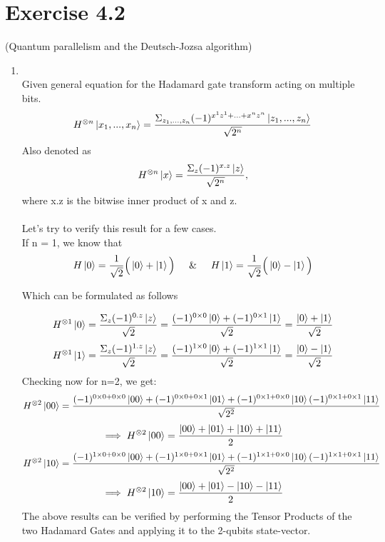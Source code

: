 \documentclass[a4paper,12pt]{article}
\begin{document}
\section*{Exercise 4.2}

 (Quantum parallelism and the Deutsch-Jozsa algorithm)

\begin{enumerate}[label=(\alph*)]
    \item \phantom{-} \\
        Given general equation for the Hadamard gate transform acting on multiple bits.
        \[H^{\otimes n}\ket{x_{1},...,x_{n}} = \frac{\Sigma_{z_{1},...,z_{n}}(-1)^{x^{1}z^{1}+...+x^{n}z^{n}}\ket{z_{1},...,z_{n}}}{\sqrt{2^{n}}}\]
        Also denoted as \[H^{\otimes n}\ket{x} = \frac{\Sigma_{z}(-1)^{x.z}\ket{z}}{\sqrt{2^{n}}},\]
        where x.z is the bitwise inner product of x and z. \\~\\
        Let's try to verify this result for a few cases.\\
        If n = 1, we know that \\
        \[H\ket{0} = \frac{1}{\sqrt{2}}\Big(\ket{0} + \ket{1}\Big) \hspace{5mm}\&\hspace{5mm}H\ket{1} = \frac{1}{\sqrt{2}}\Big(\ket{0} - \ket{1}\Big)\]
        \begin{center}
            Which can be formulated as follows
        \end{center}
        \[H^{\otimes 1}\ket{0} = \frac{\Sigma_{z}(-1)^{0.z}\ket{z}}{\sqrt{2}} = \frac{(-1)^{0 \times 0}\ket{0}+(-1)^{0 \times 1}\ket{1}}{\sqrt{2}} = \frac{\ket{0}+ \ket{1}}{\sqrt{2}}\]
        \[H^{\otimes 1}\ket{1} = \frac{\Sigma_{z}(-1)^{1.z}\ket{z}}{\sqrt{2}} = \frac{(-1)^{1 \times 0}\ket{0}+(-1)^{1 \times 1}\ket{1}}{\sqrt{2}} = \frac{\ket{0}- \ket{1}}{\sqrt{2}}\]
        Checking now for n=2, we get:
        \[H^{\otimes 2}\ket{00} = \frac{(-1)^{0 \times 0 + 0 \times 0}\ket{00} + (-1)^{0 \times 0 + 0 \times 1}\ket{01} + (-1)^{0 \times 1 + 0 \times 0}\ket{10} (-1)^{0 \times 1 + 0 \times 1}\ket{11}}{\sqrt{2^{2}}}\]
        \[\implies H^{\otimes 2}\ket{00} = \frac{\ket{00} + \ket{01} + \ket{10} + \ket{11}}{2}\]
        \[H^{\otimes 2}\ket{10} = \frac{(-1)^{1 \times 0 + 0 \times 0}\ket{00} + (-1)^{1 \times 0 + 0 \times 1}\ket{01} + (-1)^{1 \times 1 + 0 \times 0}\ket{10} (-1)^{1 \times 1 + 0 \times 1}\ket{11}}{\sqrt{2^{2}}}\]
        \[\implies H^{\otimes 2}\ket{10} = \frac{\ket{00} + \ket{01} - \ket{10} - \ket{11}}{2}\]
        The above results can be verified by performing the Tensor Products of the two Hadamard Gates and applying it to the 2-qubits state-vector. \\

\end{enumerate}
\end{document}
